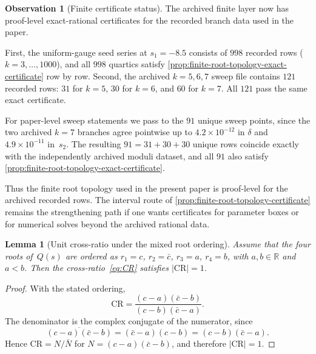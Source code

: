 \documentclass[11pt,a4paper]{article}
\theoremstyle{plain}
\newtheorem{lemma}[theorem]{Lemma}
\theoremstyle{definition}
\newtheorem{observation}[theorem]{Observation}
\theoremstyle{remark}
\newcommand{\RR}{\mathbb{R}}
\newcommand{\abs}[1]{\lvert #1 \rvert}
\begin{document}
\begin{observation}[Finite certificate status]
\label{obs:root-type}
\label{obs:finite-root-audit}
The archived finite layer now has proof-level exact-rational
certificates for the recorded branch data used in the paper.

First, the uniform-gauge seed series at $s_1=-8.5$ consists of
$998$ recorded rows ($k=3,\ldots,1000$), and all $998$ quartics satisfy
\cref{prop:finite-root-topology-exact-certificate} row by row.
Second, the archived $k=5,6,7$ sweep file contains $121$ recorded rows:
$31$ for $k=5$, $30$ for $k=6$, and $60$ for $k=7$.
All $121$ pass the same exact certificate.

For paper-level sweep statements we pass to the $91$ unique sweep
points, since the two archived $k=7$ branches agree pointwise up to
$4.2\times10^{-12}$ in $\delta$ and $4.9\times10^{-11}$ in~$s_2$.
The resulting $91=31+30+30$ unique rows coincide exactly with the
independently archived moduli dataset, and all $91$ also satisfy
\cref{prop:finite-root-topology-exact-certificate}.

Thus the finite root topology used in the present paper is proof-level
for the archived recorded rows.  The interval route of
\cref{prop:finite-root-topology-certificate} remains the strengthening
path if one wants certificates for parameter boxes or for numerical
solves beyond the archived rational data.
\end{observation}

\begin{lemma}[Unit cross-ratio under the mixed root ordering]
\label{lem:CR-unit}
Assume that the four roots of~$Q(s)$ are ordered as
$r_1 = c$, $r_2 = \bar c$, $r_3 = a$, $r_4 = b$, with
$a,b \in \RR$ and $a < b$.  Then the cross-ratio~\eqref{eq:CR}
satisfies $\abs{\mathrm{CR}} = 1$.
\end{lemma}

\begin{proof}
With the stated ordering,
\[
  \mathrm{CR}
  = \frac{(c-a)(\bar c-b)}{(c-b)(\bar c-a)}.
\]
The denominator is the complex conjugate of the numerator, since
\[
  \overline{(c-a)(\bar c-b)} = (\bar c-a)(c-b) = (c-b)(\bar c-a).
\]
Hence $\mathrm{CR}=N/\bar N$ for $N=(c-a)(\bar c-b)$, and therefore
$\abs{\mathrm{CR}} = 1$.
\end{proof}
\end{document}
